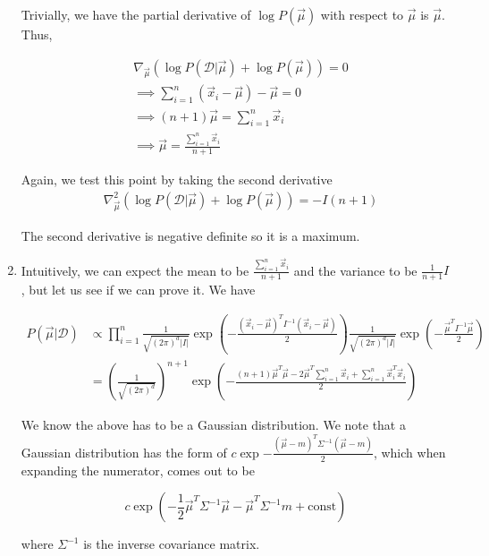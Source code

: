 \documentclass[11pt]{article}
\begin{document}
\begin{enumerate}
		Trivially, we have the partial derivative of $\log P(\vec{\mu})$ with respect to $\vec{\mu}$ is $\vec{\mu}$. Thus, 
		
		\begin{align*}
		    &\nabla_{\vec{\mu}} (\log P(\mathcal{D} | \vec{\mu}) + \log P(\vec{\mu})) = 0\\
		    &\implies \sum_{i=1}^n( \vec{x}_i - \vec{\mu}) - \vec{\mu} = 0 \\
		    &\implies (n+1)\vec{\mu} = \sum_{i=1}^n \vec{x}_i \\
		    &\implies \boxed{\vec{\mu} = \frac{\sum_{i=1}^n \vec{x}_i}{n+1}}
		\end{align*}
		
		Again, we test this point by taking the second derivative
		\begin{align*}
            &\nabla_{\vec{\mu}}^2 (\log P(\mathcal{D} | \vec{\mu}) + \log P(\vec{\mu})) = -I(n+1)
		\end{align*}
		
		The second derivative is negative definite so it is a maximum.
		
		\item Intuitively, we can expect the mean to be $\frac{\sum_{i=1}^n \vec{x}_i}{n+1}$ and the variance to be $\frac{1}{n+1}I$, but let us
		see if we can prove it. We have 
		
		\begin{align*}
		    P(\vec{\mu} | \mathcal{D}) &\propto \prod_{i=1}^n \frac{1}{\sqrt{\left ( 2 \pi \right )^d |I|}} \exp \left ( -\frac{\left ( \vec{x}_i - \vec{\mu} \right )^TI^{-1} \left ( \vec{x}_i - \vec{\mu} \right )}{2} \right ) \frac{1}{\sqrt{\left (2 \pi \right )^d |I|}} \exp \left (- \frac{\vec{\mu}^TI^{-1}\vec{\mu}}{2} \right ) \\
		    &= \left ( \frac{1}{\sqrt{(2\pi)^d}} \right )^{n+1} \exp \left (-\frac{(n+1)\vec{\mu}^T\vec{\mu} - 2\vec{\mu}^T\sum_{i=1}^n\vec{x}_i + \sum_{i=1}^n\vec{x}_i^T\vec{x}_i}{2} \right )
		\end{align*}
		
		We know the above has to be a Gaussian distribution. We note that a Gaussian distribution has the form of $c \exp {-\frac{(\vec{\mu}-m)^T\Sigma^{-1}(\vec{\mu}-m)}{2}}$,
		which when expanding the numerator, comes out to be
		
		\[c \exp \left (-\frac{1}{2} \vec{\mu}^T\Sigma^{-1}\vec{\mu} - \vec{\mu}^T \Sigma^{-1} m + \text{const} \right )\]
		
		where $\Sigma^{-1}$ is the inverse covariance matrix.
		

\end{enumerate}
\end{document}
